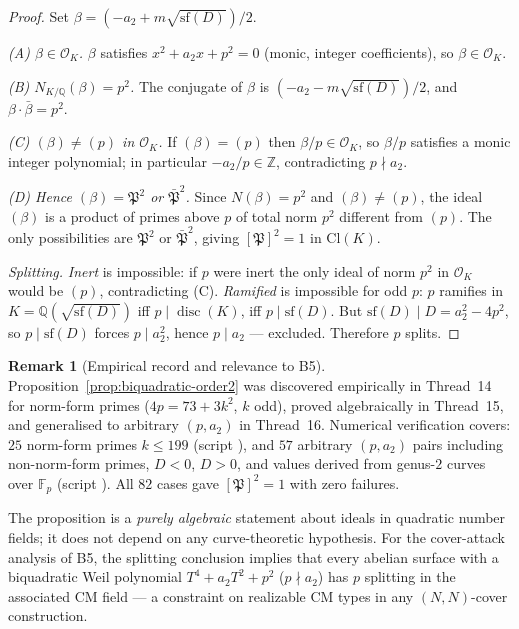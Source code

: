 \documentclass[11pt,a4paper]{article}
\theoremstyle{definition}
\newtheorem{remark}[theorem]{Remark}
\newcommand{\FF}{\mathbb{F}}
\newcommand{\ZZ}{\mathbb{Z}}
\newcommand{\QQ}{\mathbb{Q}}
\newcommand{\disc}{\operatorname{disc}}
\begin{document}
\begin{proof}
Set $\beta = (-a_2 + m\sqrt{\mathrm{sf}(D)})/2$.

\smallskip
\noindent\textit{(A) $\beta \in \mathcal{O}_K$.}
$\beta$ satisfies $x^2 + a_2 x + p^2 = 0$ (monic, integer coefficients), so
$\beta \in \mathcal{O}_K$.

\smallskip
\noindent\textit{(B) $N_{K/\QQ}(\beta) = p^2$.}
The conjugate of $\beta$ is $(-a_2 - m\sqrt{\mathrm{sf}(D)})/2$, and
$\beta \cdot \bar\beta = p^2$.

\smallskip
\noindent\textit{(C) $(\beta) \neq (p)$ in $\mathcal{O}_K$.}
If $(\beta) = (p)$ then $\beta/p \in \mathcal{O}_K$, so $\beta/p$ satisfies a monic
integer polynomial; in particular $-a_2/p \in \ZZ$, contradicting $p \nmid a_2$.

\smallskip
\noindent\textit{(D) Hence $(\beta) = \mathfrak{P}^2$ or $\bar{\mathfrak{P}}^2$.}
Since $N(\beta) = p^2$ and $(\beta) \neq (p)$, the ideal $(\beta)$ is a product of
primes above $p$ of total norm $p^2$ different from $(p)$.
The only possibilities are $\mathfrak{P}^2$ or $\bar{\mathfrak{P}}^2$, giving
$[\mathfrak{P}]^2 = 1$ in $\mathrm{Cl}(K)$.

\smallskip
\noindent\textit{Splitting.}
\emph{Inert} is impossible: if $p$ were inert the only ideal of norm $p^2$ in
$\mathcal{O}_K$ would be $(p)$, contradicting (C).
\emph{Ramified} is impossible for odd $p$: $p$ ramifies in $K = \QQ(\sqrt{\mathrm{sf}(D)})$
iff $p \mid \disc(K)$, iff $p \mid \mathrm{sf}(D)$.
But $\mathrm{sf}(D) \mid D = a_2^2 - 4p^2$, so $p \mid \mathrm{sf}(D)$ forces
$p \mid a_2^2$, hence $p \mid a_2$ --- excluded.
Therefore $p$ splits.
\end{proof}

\begin{remark}[Empirical record and relevance to B5]\label{rem:order2-empirical}
Proposition~\ref{prop:biquadratic-order2} was discovered empirically in Thread~14
for norm-form primes ($4p = 73 + 3k^2$, $k$ odd), proved algebraically in
Thread~15, and generalised to arbitrary $(p, a_2)$ in Thread~16.
Numerical verification covers:
$25$ norm-form primes $k \leq 199$ (script ),
and $57$ arbitrary $(p, a_2)$ pairs including non-norm-form primes, $D < 0$, $D > 0$,
and values derived from genus-$2$ curves over $\FF_p$
(script ).
All $82$ cases gave $[\mathfrak{P}]^2 = 1$ with zero failures.

The proposition is a \emph{purely algebraic} statement about ideals in quadratic
number fields; it does not depend on any curve-theoretic hypothesis.
For the cover-attack analysis of B5, the splitting conclusion implies that
every abelian surface with a biquadratic Weil polynomial $T^4 + a_2 T^2 + p^2$
($p \nmid a_2$) has $p$ splitting in the associated CM field --- a constraint
on realizable CM types in any $(N,N)$-cover construction.
\end{remark}
\end{document}
